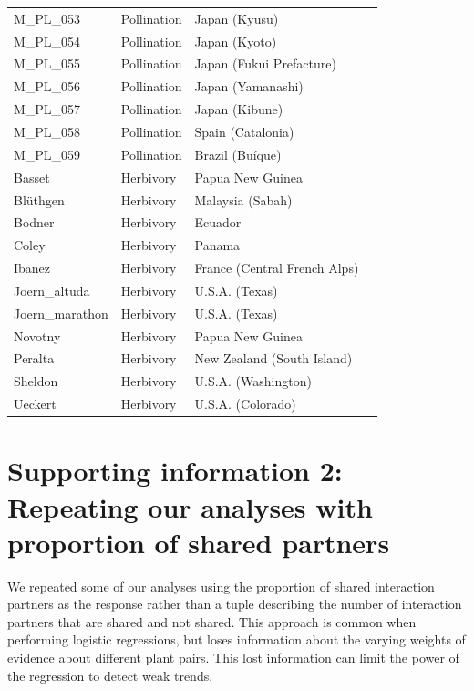 \documentclass[12pt]{article}
\begin{document}
\begin{spacing}{1.5}
\begin{table}[h!]
\begin{center}
\begin{tabular}{|l l l m{6cm} |}
    M\_PL\_053  & Pollination & Japan (Kyusu) & \citet{Yamazaki2003}  \\
    M\_PL\_054  & Pollination & Japan (Kyoto) & \citet{Kakutani1990}  \\
    M\_PL\_055  & Pollination & Japan (Fukui Prefacture) & \citet{Kato1996}  \\
    M\_PL\_056  & Pollination & Japan (Yamanashi) & \citet{Kato1993}  \\
    M\_PL\_057  & Pollination & Japan (Kibune) & \citet{Inoue1990} \\
    M\_PL\_058  & Pollination & Spain (Catalonia) & \citet{Bartomeus2008} \\
    M\_PL\_059  & Pollination & Brazil (Bu\'{i}que) & \citet{Bezerra2009} \\
    Basset  & Herbivory & Papua New Guinea & \citet{Basset1996}  \\
    Bl\"{u}thgen  & Herbivory & Malaysia (Sabah) & \citet{Bluthgen2006a}  \\
    Bodner  & Herbivory & Ecuador & \citet{Bodner2010}  \\
    Coley & Herbivory & Panama & \citet{Coley2006} \\
    Ibanez  & Herbivory & France (Central French Alps) & \citet{Ibanez2013}  \\
    Joern\_altuda  & Herbivory & U.S.A. (Texas) & \citet{Joern1979} \\
    Joern\_marathon  & Herbivory & U.S.A. (Texas) & \citet{Joern1979} \\
    Novotny & Herbivory & Papua New Guinea & \citet{Novotny2012} \\
    Peralta & Herbivory & New Zealand (South Island) & \citet{Peralta2016} \\
    Sheldon & Herbivory & U.S.A. (Washington) & \citet{Sheldon1978} \\
    Ueckert & Herbivory & U.S.A. (Colorado) & \citet{Ueckert1971} \\
    \hline
    \end{tabular}
    \end{center}
    \end{table}
\clearpage
\newpage

\section*{Supporting information 2: Repeating our analyses with proportion of shared partners}

    We repeated some of our analyses using the proportion of shared interaction partners as the response rather than a tuple describing the number of interaction partners that are shared and not shared. This approach is common when performing logistic regressions, but loses information about the varying weights of evidence about different plant pairs. This lost information can limit the power of the regression to detect weak trends.



\end{spacing}
\end{document}
